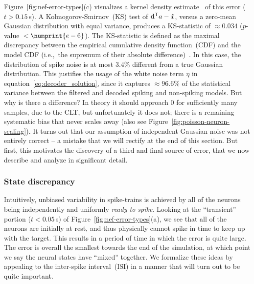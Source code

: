
Figure~\ref{fig:nef-error-types}(c) visualizes a kernel density estimate~\citep[KDE;][]{michael_waskom_2015_19108} of this error ($t > 0.15$\,s).
A Kolmogorov-Smirnov~(KS) test of ${\mathbf{d}}^\mathsf{T}a - \hat{x}$, versus a zero-mean Gaussian distribution with equal variance, produces a KS-statistic of $\approx 0.034$ ($p$-value~$< \numprint{e-6}$).
The KS-statistic is defined as the maximal discrepancy between the empirical cumulative density function~(CDF) and the model CDF (i.e.,~the supremum of their absolute difference)~\citep{massey1951kolmogorov}.
In this case, the distribution of spike noise is at most $3.4$\% different from a true Gaussian distribution.
This justifies the usage of the white noise term $\eta$ in equation~\ref{eq:decoder_solution}, since it captures $\approx 96.6$\% of the statistical variance between the filtered and decoded spiking and non-spiking models.
But why is there a difference?
In theory it should approach $0$ for sufficiently many samples, due to the CLT, but unfortunately it does not; there is a remaining systematic bias that never scales away (also see Figure~\ref{fig:poisson-neuron-scaling}).
It turns out that our assumption of independent Gaussian noise was not entirely correct -- a mistake that we will rectify at the end of this section.
But first, this motivates the discovery of a third and final source of error, that we now describe and analyze in significant detail.

\subsubsection{State discrepancy}

Intuitively, unbiased variability in spike-trains is achieved by all of the neurons being independently and uniformly \emph{ready to spike}.
Looking at the ``transient'' portion ($t < 0.05$\,s) of Figure~\ref{fig:nef-error-types}(a), we see that all of the neurons are initially at rest, and thus physically cannot spike in time to keep up with the target.
This results in a period of time in which the error is quite large.
The error is overall the smallest towards the end of the simulation, at which point we say the neural states have ``mixed'' together.
We formalize these ideas by appealing to the inter-spike interval~(ISI) in a manner that will turn out to be quite important.


